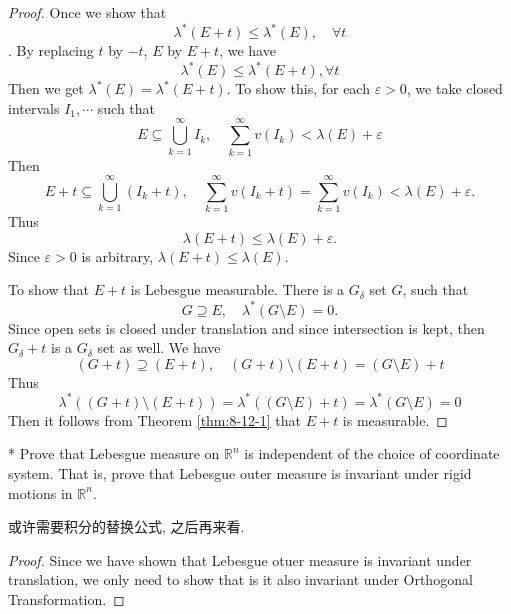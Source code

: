 \documentclass[../main.tex]{subfiles}
\begin{document}
\begin{proof}
    Once we show that \[
     \lambda ^{*}\left( E+ t\right)\le  \lambda ^{*}\left( E\right),\quad \forall t  
    \]. By replacing \(  t  \) by \(  -t  \), \(  E  \)   by \(  E + t \), we have \[
     \lambda ^{*}\left( E \right) \le  \lambda ^{*}\left( E+ t \right),\forall t 
    \]Then we get \(   \lambda ^{*}\left( E \right)=  \lambda ^{*}\left( E+ t \right)    \).  To show this, for each \(   \varepsilon > 0  \), we take closed intervals \(  I_1,\cdots   \) such that \[
    E\subseteq \bigcup _{k = 1}^{\infty} I _{k},\quad  \sum _{k = 1}^{\infty} v\left(  I _{k} \right)<  \lambda \left( E \right)+  \varepsilon   
    \] Then \[
    E+ t\subseteq \bigcup _{ k= 1}^{\infty} \left( I _{k}+ t \right),\quad \sum _{k = 1}^{\infty} v\left( I _{k}+ t \right)= \sum _{k = 1}^{\infty} v\left( I _{k} \right)   <  \lambda \left( E \right)+  \varepsilon  . 
    \]    Thus \[
     \lambda \left( E+ t \right)\le  \lambda \left( E \right)+  \varepsilon   .
    \] Since \(   \varepsilon > 0  \) is arbitrary, \(   \lambda \left( E+ t \right)\le  \lambda \left( E \right)    \). 
    
    To show that \(  E+ t  \) is Lebesgue measurable. There is a \(  G_{ \delta }  \) set \(  G  \), such that  \[
    G\supseteq E,\quad  \lambda ^{*}\left( G\setminus E \right)= 0 . 
    \] Since open sets is closed under translation  and since intersection is kept, then \(  G_{ \delta }+ t  \) is a \(  G_{ \delta }  \) set as well. We have \[
    \left( G+ t \right)\supseteq \left( E+ t \right),\quad  \left( G+ t \right)\setminus \left( E+ t \right)= \left( G\setminus E \right)+ t      
    \]   Thus \[
     \lambda ^{*}\left( \left( G+ t \right)\setminus \left( E+ t \right)   \right)=  \lambda ^{*}\left( \left( G\setminus E \right)+ t  \right)=  \lambda ^{*}\left( G\setminus E \right)= 0   
    \] Then it follows from Theorem \ref{thm:8-12-1} that \(  E+ t  \) is measurable.  
\end{proof}

\begin{exercise}*{}{}
Prove that Lebesgue measure on $\mathbb{R}^n$ is independent of the choice of coordinate system. That is, prove that Lebesgue outer measure is invariant under rigid motions in $\mathbb{R}^n$.
\end{exercise}
\begin{remark}
    或许需要积分的替换公式, 之后再来看. 
\end{remark}

\begin{proof}
    Since we have shown that Lebesgue otuer measure is invariant under translation, we only need to show that is it also invariant under Orthogonal Transformation. 
\end{proof}
\end{document}
